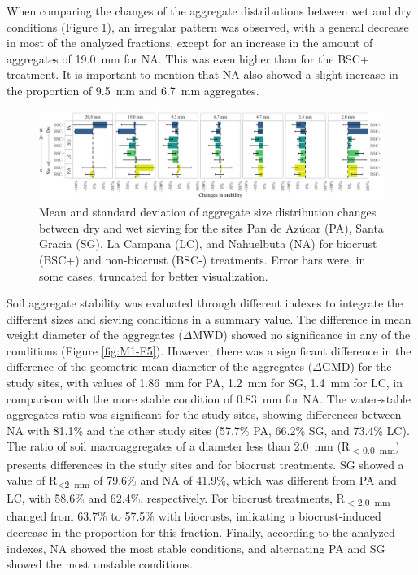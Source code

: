 \FloatBarrier

When comparing the changes of the aggregate distributions between wet and dry conditions (Figure \ref{fig:M1-F4}), an irregular pattern was observed, with a general decrease in most of the analyzed fractions, except for an increase in the amount of aggregates of \SI{19.0}{\milli\meter} for NA. This was even higher than for the BSC+ treatment. It is important to mention that NA also showed a slight increase in the proportion of \SI{9.5}{\milli\meter} and \SI{6.7}{\milli\meter} aggregates.

\begin{figure}[H]
	\centering
	\includegraphics[width=1\textwidth]{img/M1-Figure_4.png}
	\caption{Mean and standard deviation of aggregate size distribution changes between dry and wet sieving for the sites Pan de Azúcar (PA), Santa Gracia (SG), La Campana (LC), and Nahuelbuta (NA) for biocrust (BSC+) and non-biocrust (BSC-) treatments. Error bars were, in some cases, truncated for better visualization.}
	\label{fig:M1-F4}
\end{figure}

\FloatBarrier

Soil aggregate stability was evaluated through different indexes to integrate the different sizes and sieving conditions in a summary value. The difference in mean weight diameter of the aggregates ($\Delta$MWD) showed no significance in any of the conditions (Figure \ref{fig:M1-F5}). However, there was a significant difference in the difference of the geometric mean diameter of the aggregates ($\Delta$GMD) for the study sites, with values of \SI{1.86}{\milli\meter} for PA, \SI{1.2}{\milli\meter} for SG, \SI{1.4}{\milli\meter} for LC, in comparison with the more stable condition of \SI{0.83}{\milli\meter} for NA. The water-stable aggregates ratio was significant for the study sites, showing differences between NA with 81.1\% and the other study sites (57.7\% PA, 66.2\% SG, and 73.4\% LC). The ratio of soil macroaggregates of a diameter less than \SI{2.0}{\milli\meter} (R\textsubscript{$<$\SI{0.0}{\milli\meter}}) presents differences in the study sites and for biocrust treatments. SG showed a value of R\textsubscript{<\SI{2}{\milli\meter}} of 79.6\% and NA of 41.9\%, which was different from PA and LC, with 58.6\% and 62.4\%, respectively. For biocrust treatments, R\textsubscript{$<$\SI{2.0}{\milli\meter}} changed from 63.7\% to 57.5\% with biocrusts, indicating a biocrust-induced decrease in the proportion for this fraction. Finally, according to the analyzed indexes, NA showed the most stable conditions, and alternating PA and SG showed the most unstable conditions.

